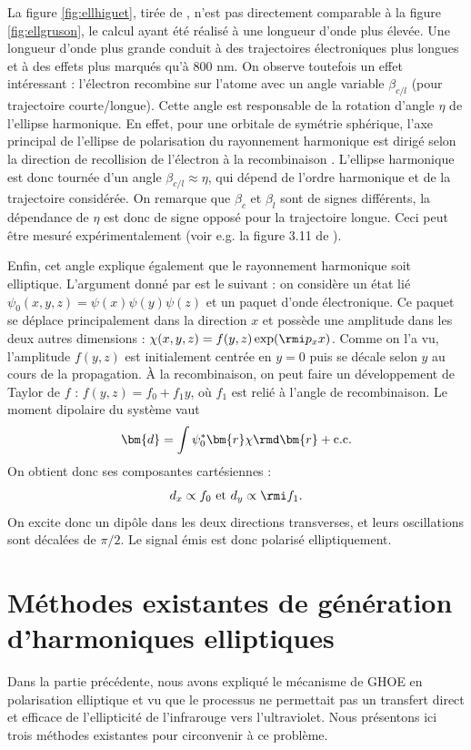 La figure \ref{fig:ellhiguet}, tirée de , n'est pas directement comparable à la figure \ref{fig:ellgruson}, le calcul ayant été réalisé à une longueur d'onde plus élevée. Une longueur d'onde plus grande conduit à des trajectoires électroniques plus longues et à des effets plus marqués qu'à 800 nm.
On observe toutefois un effet intéressant : l'électron recombine sur l'atome avec un angle variable $\beta_{c/l}$ (pour trajectoire courte/longue). Cette angle est responsable de la rotation d'angle $\eta$ de l'ellipse harmonique. En effet, pour une orbitale de symétrie sphérique, l'axe principal de l'ellipse de polarisation du rayonnement harmonique est dirigé selon la direction de recollision de l'électron à la recombinaison . L'ellipse harmonique est donc tournée d'un angle $\beta_{c/l}\approx\eta$, qui dépend de l'ordre harmonique et de la trajectoire considérée. On remarque que $\beta_c$ et $\beta_l$ sont de signes différents, la dépendance de $\eta$ est donc de signe opposé pour la trajectoire longue. Ceci peut être mesuré expérimentalement (voir e.g. la figure 3.11 de ).\par
Enfin, cet angle explique également que le rayonnement harmonique soit elliptique. L'argument donné par  est le suivant : on considère un état lié $\psi_0(x,y,z) = \psi(x)\psi(y)\psi(z)$ et un paquet d'onde électronique. Ce paquet se déplace principalement dans la direction $x$ et possède une amplitude dans les deux autres dimensions : $\chi(x,y,z) = f(y,z)\exp(\rmi p_x x)$. Comme on l'a vu, l'amplitude $f(y,z)$ est initialement centrée en $y=0$ puis se décale selon $y$ au cours de la propagation. \`{A} la recombinaison, on peut faire un développement de Taylor de $f$ : $f(y,z) = f_0 + f_1 y$, où $f_1$ est relié à l'angle de recombinaison. Le moment dipolaire du système vaut 
\[\bm{d} = \int{\psi_0^* \bm{r} \chi \rmd\bm{r}} + \text{c.c.}\]
On obtient donc ses composantes cartésiennes :
\[d_x \propto f_0 \text{  et  } d_y \propto \rmi f_1.\]
On excite donc un dipôle dans les deux directions transverses, et leurs oscillations sont décalées de $\pi/2$. Le signal émis est donc polarisé elliptiquement.

\section{Méthodes existantes de génération d'harmoniques elliptiques}
Dans la partie précédente, nous avons expliqué le mécanisme de GHOE en polarisation elliptique et vu que le processus ne permettait pas un transfert direct et efficace de l'ellipticité de l'infrarouge vers l'ultraviolet. Nous présentons ici trois méthodes existantes pour circonvenir à ce problème. 

